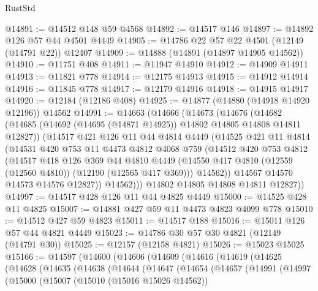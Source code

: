\begin{lexlean}{RustStd}
\begin{coremodule}
@14891 := @14512 @148 @59 @4568
@14892 := @14517 @146
@14897 := @14892 @126 @57 @44 @4501 @4449
@14905 := @14786 @22 @57 @22 @4501 (@12149 (@14791 @22)) @12407
@14909 := @14888 (@14891 (@14897 @14905 @14562))
@14910 := @11751 @408
@14911 := @11947 @14910
@14912 := @14909 @14911
@14913 := @11821 @778
@14914 := @12175 @14913
@14915 := @14912 @14914
@14916 := @11845 @778
@14917 := @12179 @14916
@14918 := @14915 @14917
@14920 := @12184 (@12186 @408)
@14925 := @14877 (@14880 (@14918 @14920 @12196)) @14562
@14991 := @14663
    (@14666
      (@14673
        (@14676
          (@14682
            (@14685 (@14692 (@14695 (@14871 @14925)) @14802 @14805 @14808 @14811 @12827))
            (@14517
              @421
              @126
              @11
              @44
              @4814
              @4449
              (@14525
                @421
                @11
                @4814
                (@14531
                  @420
                  @753
                  @11
                  @4473
                  @4812
                  @4068
                  @759
                  (@14512
                    @420
                    @753
                    @4812
                    (@14517
                      @418
                      @126
                      @369
                      @44
                      @4810
                      @4449
                      (@14550 @417 @4810 (@12559 (@12560 @4810)) (@12190 (@12565 @417 @369)))
                      @14562))
                  @14567
                  @14570
                  @14573
                  @14576
                  @12827))
              @14562)))
        @14802
        @14805
        @14808
        @14811
        @12827))
@14997 := @14517 @428 @126 @11 @44 @4825 @4449
@15000 := @14525 @428 @11 @4825
@15007 := @14881 @427 @59 @11 @4473 @4823 @4099 @778
@15010 := @14512 @427 @59 @4823
@15011 := @14517 @188
@15016 := @15011 @126 @57 @44 @4821 @4449
@15023 := @14786 @30 @57 @30 @4821 (@12149 (@14791 @30))
@15025 := @12157 (@12158 @4821)
@15026 := @15023 @15025
@15166 := @14597
    (@14600
      (@14606
        (@14609
          (@14616
            (@14619
              (@14625
                (@14628
                  (@14635
                    (@14638
                      (@14644
                        (@14647
                          (@14654
                            (@14657
                              (@14991
                                (@14997
                                  (@15000
                                    (@15007
                                      (@15010 (@15016 @15026 @14562))

\end{coremodule}
\end{lexlean}

